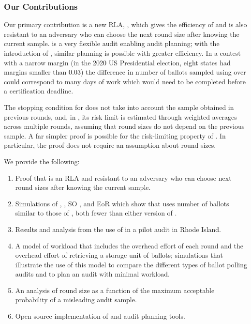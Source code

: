 \subsubsection{Our Contributions}
Our primary contribution is a new RLA, \Providence, which gives the efficiency of \Minerva and is also resistant to an adversary who can choose the next round size after knowing the current sample. 
\BRAVO is a very flexible audit enabling audit planning; with the introduction of \Providence, similar planning is possible with greater efficiency. In a contest with a narrow margin (in the 2020 US Presidential election, eight states had margins smaller than 0.03) the difference in number of ballots sampled using \Providence over \BRAVO could correspond to many days of work which would need to be completed before a certification deadline.

The stopping condition for \Minerva does not take into account the sample obtained in previous rounds, and, in \cite{usenix_minerva}, its risk limit is estimated through weighted averages across multiple rounds, assuming that round sizes do not depend on the previous sample. 
A far simpler proof is possible for the risk-limiting property of \Providence. 
In particular, the proof does not require an assumption about round sizes. 

We provide the following:
\begin{enumerate}
\item Proof that \Providence is an RLA and resistant to an adversary who can choose next round sizes after knowing the current sample.
\item Simulations of \Providence, \Minerva, SO \BRAVO, and EoR \BRAVO which show that \Providence uses number of ballots similar to those of \Minerva, both fewer than either version of \BRAVO.
\item Results and analysis from the use of \Providence in a pilot audit in Rhode Island.
\item A model of workload that includes the overhead effort of each round and the overhead effort of retrieving a storage unit of ballots; simulations that illustrate the use of this model to compare the different types of ballot polling audits and to plan an audit with minimal workload.
\item An analysis of round size as a function of the maximum acceptable probability of a misleading audit sample.
\item Open source implementation of \Providence and audit planning tools. 
\end{enumerate}

